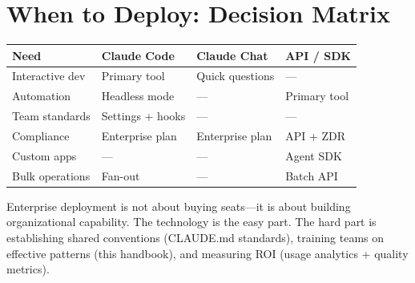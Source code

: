\section{When to Deploy: Decision Matrix}

\begin{fullwidth}
\begin{tabular}{@{}p{3cm}p{3cm}p{3cm}p{3cm}@{}}
\toprule
\textbf{Need} & \textbf{Claude Code} & \textbf{Claude Chat} & \textbf{API / SDK} \\
\midrule
Interactive dev & Primary tool & Quick questions & --- \\
Automation & Headless mode & --- & Primary tool \\
Team standards & Settings + hooks & --- & --- \\
Compliance & Enterprise plan & Enterprise plan & API + ZDR \\
Custom apps & --- & --- & Agent SDK \\
Bulk operations & Fan-out & --- & Batch API \\
\bottomrule
\end{tabular}
\end{fullwidth}

\begin{keyinsight}
Enterprise deployment is not about buying seats---it is about
building organizational capability. The technology is the easy part.
The hard part is establishing shared conventions (CLAUDE.md standards),
training teams on effective patterns (this handbook),
and measuring ROI (usage analytics + quality metrics).
\end{keyinsight}
